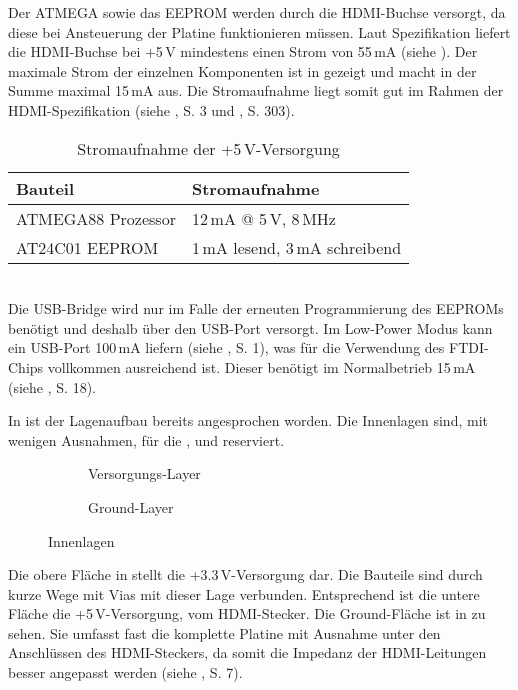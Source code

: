 Der ATMEGA sowie das EEPROM werden durch die HDMI-Buchse versorgt, da diese bei Ansteuerung der Platine funktionieren müssen. Laut Spezifikation liefert die HDMI-Buchse bei +5\,V mindestens einen Strom von 55\,mA (siehe \cite{HDMI11}). Der maximale Strom der einzelnen Komponenten ist in  gezeigt und macht in der Summe maximal 15\,mA aus. Die Stromaufnahme liegt somit gut im Rahmen der HDMI-Spezifikation (siehe \cite{Atmel2011}, S. 3 und \cite{Atmel2003}, S. 303).
\begin{table}[h]
\begin{tabular}{|p{8.5cm}|p{5cm}|}\hline
\rowcolor{TableBackgroundColor} 
   \textbf{Bauteil} & \textbf{Stromaufnahme} \\ \hline
    ATMEGA88 Prozessor & 12\,mA @ 5\,V, 8\,MHz\\ \hline
	AT24C01 EEPROM & 1\,mA lesend, 3\,mA schreibend\\ \hline
\end{tabular}
\caption{Stromaufnahme der +5\,V-Versorgung}
\label{tab:5v_strom}
\end{table} \\
Die USB-Bridge  wird nur im Falle der erneuten Programmierung des EEPROMs benötigt und deshalb über den USB-Port versorgt. Im Low-Power Modus kann ein USB-Port 100\,mA liefern (siehe \cite{USB2005}, S. 1), was für die Verwendung des FTDI-Chips vollkommen ausreichend ist. Dieser benötigt im Normalbetrieb 15\,mA (siehe \cite{FTDI2010}, S. 18).

In  ist der Lagenaufbau bereits angesprochen worden. Die Innenlagen sind, mit wenigen Ausnahmen, für die ,  und  reserviert. 
\begin{figure}[htbp]
        \centering
        \begin{subfigure}[htp]{0.48\textwidth}
                \caption{Versorgungs-Layer}
                \label{fig:teilb_vcc_layer}
        \end{subfigure}
		\quad 
        \begin{subfigure}[htp]{0.48\textwidth}
                             								\caption{Ground-Layer}
                \label{fig:teilb_gnd_layer}
        \end{subfigure}
        \caption{Innenlagen}
        \label{fig:teilb_vcc_gnd_layer}
\end{figure}
Die obere Fläche in  stellt die +3.3\,V-Versorgung dar. Die Bauteile sind durch kurze Wege mit Vias mit dieser Lage verbunden. Entsprechend ist die untere Fläche die +5\,V-Versorgung, vom HDMI-Stecker. Die Ground-Fläche ist in  zu sehen. Sie umfasst fast die komplette Platine mit Ausnahme unter den Anschlüssen des HDMI-Steckers, da somit die Impedanz der HDMI-Leitungen besser angepasst werden (siehe \cite{TI2007}, S. 7). 